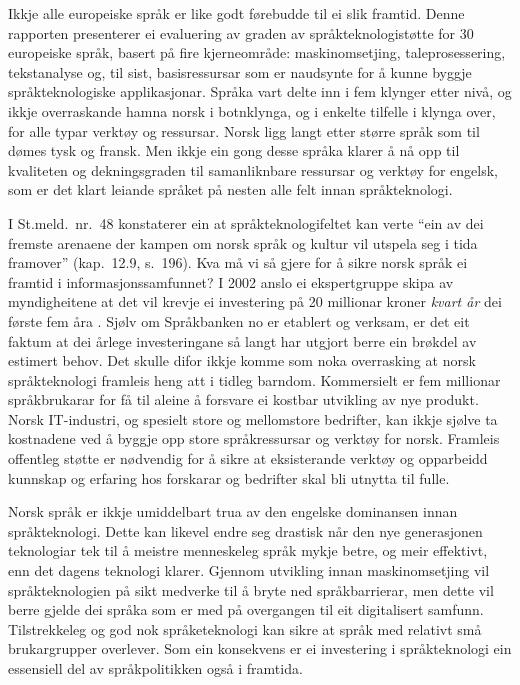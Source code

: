 \begin{multicols}{2}
Ikkje alle europeiske språk er like godt førebudde til ei slik framtid. Denne rapporten presenterer ei evaluering av graden av språkteknologistøtte for 30 europeiske språk, basert på fire kjerneområde: maskinomsetjing, taleprosessering, tekstanalyse og, til sist, basisressursar som er naudsynte for å kunne byggje språkteknologiske applikasjonar. Språka vart delte inn i fem klynger etter nivå, og ikkje overraskande hamna norsk i botnklynga, og i enkelte tilfelle i klynga over, for alle typar verktøy og ressursar. Norsk ligg langt etter større språk som til dømes tysk og fransk. Men ikkje ein gong desse språka klarer å nå opp til kvaliteten og dekningsgraden til samanliknbare ressursar og verktøy for engelsk, som er det klart leiande språket på nesten alle felt innan språkteknologi.

I St.meld.~nr.~48 \cite{stm48:2002} konstaterer ein at språkteknologifeltet kan verte ``ein av dei fremste arenaene der kampen om norsk språk og kultur vil utspela seg i tida framover'' (kap.~12.9, s.~196). Kva må vi så gjere for å sikre norsk språk ei framtid i informasjonssamfunnet? I 2002 anslo ei ekspertgruppe skipa av myndigheitene at det vil krevje ei investering på 20 millionar kroner \emph{kvart år} dei første fem åra \cite{SR:2002:eng}. Sjølv om Språkbanken no er etablert og verksam, er det eit faktum at dei årlege investeringane så langt har utgjort berre ein brøkdel av estimert behov. Det skulle difor ikkje komme som noka overrasking at norsk språkteknologi framleis heng att i tidleg barndom. Kommersielt er fem millionar språkbrukarar for få til aleine å forsvare ei kostbar utvikling av nye produkt. Norsk IT-industri, og spesielt store og mellomstore bedrifter, kan ikkje sjølve ta kostnadene ved å byggje opp store språkressursar og verktøy for norsk. Framleis offentleg støtte er nødvendig for å sikre at eksisterande verktøy og opparbeidd kunnskap og erfaring hos forskarar og bedrifter skal bli utnytta til fulle. 

Norsk språk er ikkje umiddelbart trua av den engelske dominansen innan språkteknologi. Dette kan likevel endre seg drastisk når den nye generasjonen teknologiar tek til å meistre menneskeleg språk mykje betre, og meir effektivt, enn det dagens teknologi klarer. Gjennom utvikling innan maskinomsetjing vil språkteknologien på sikt medverke til å bryte ned språkbarrierar, men dette vil berre gjelde dei språka som er med på overgangen til eit digitalisert samfunn. Tilstrekkeleg og god nok språketeknologi kan sikre at språk med relativt små brukargrupper overlever. Som ein konsekvens er ei investering i språkteknologi ein essensiell del av språkpolitikken også i framtida.                                


\end{multicols}
